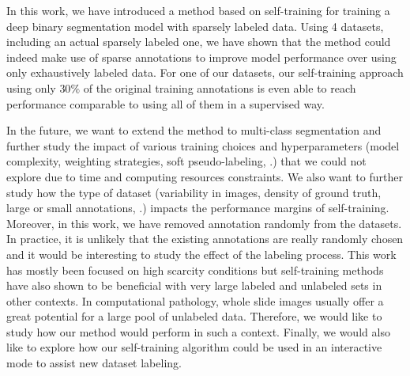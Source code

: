 In this work, we have introduced a method based on self-training for training a deep binary segmentation model with sparsely labeled data. Using 4 datasets, including an actual sparsely labeled one, we have shown that the method could indeed make use of sparse annotations to improve model performance over using only exhaustively labeled data. For one of our datasets, our self-training approach using only $30\%$ of the original training annotations is even able to reach performance comparable to using all of them in a supervised way.

In the future, we want to extend the method to multi-class segmentation and further study the impact of various training choices and hyperparameters (model complexity, weighting strategies, soft pseudo-labeling, \etc.) that we could not explore due to time and computing resources constraints. We also want to further study how the type of dataset (variability in images, density of ground truth, large or small annotations, \etc.) impacts the performance margins of self-training. Moreover, in this work, we have removed annotation randomly from the datasets. In practice, it is unlikely that the existing annotations are really randomly chosen and it would be interesting to study the effect of the labeling process. This work has mostly been focused on high scarcity conditions but self-training methods have also shown to be beneficial with very large labeled and unlabeled sets in other contexts. In computational pathology, whole slide images usually offer a great potential for a large pool of unlabeled data. Therefore, we would like to study how our method would perform in such a context. Finally, we would also like to explore how our self-training algorithm could be used in an interactive mode to assist new dataset labeling. %

